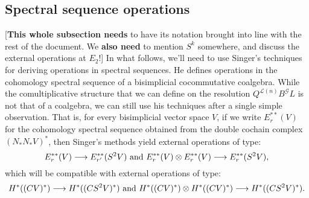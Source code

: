\documentclass[11pt]{amsart}
\theoremstyle{plain}
\theoremstyle{definition}
\renewcommand{\to}{\longrightarrow}
\newcommand{\scrG}{\mathscr{G}}
\newcommand{\calL}{\mathcal{L}}
\theoremstyle{plain}
\newcommand{\BSW}{{\scrG}}
\newcommand{\BSWres}{B^\BSW}%
\begin{document}
\begin{Composite functor spectral sequences}
\subsection{Spectral sequence operations}
[\textbf{This whole subsection needs} to have its notation brought into line with the rest of the document. We \textbf{also need} to mention $S^k$ somewhere, and discuss the external operations at $E_2$!] In what follows, we'll need to use Singer's techniques for deriving operations in spectral sequences. He defines operations in the cohomology spectral sequence of a bisimplicial cocommutative coalgebra. While the comultiplicative structure that we can define on the resolution $Q^{\calL(n)}\BSWres L$ is not that of a coalgebra, we can still use his techniques after a single simple observation. That is, for every bisimplicial vector space $V$, if we write $E_r^{**}(V)$ for the cohomology spectral sequence obtained from the double cochain complex $(N_*N_*V)^*$, then Singer's methods yield external operations of type:
\[E_r^{**}(V)\to E_{r'}^{**}(S^2V)\textup{ and }E_r^{**}(V)\otimes E_r^{**}(V)\to E_r^{**}(S^2V),\]
which will be compatible with external operations of type:
\[H^{*}((CV)^*)\to H^{*}((CS^2V)^*)\textup{ and }H^{*}((CV)^*)\otimes H^{*}((CV)^*)\to H^{*}((CS^2V)^*).\]


\end{Composite functor spectral sequences}
\end{document}
